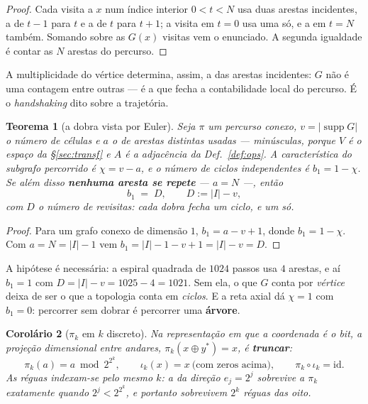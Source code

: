 \documentclass[11pt,a4paper]{article}
\newcommand{\abs}[1]{\lvert #1\rvert}
\newtheorem{teorema}{Teorema}
\newtheorem{corolario}[teorema]{Corolário}
\begin{document}
\begin{proof}
Cada visita a $x$ num índice interior $0<t<N$ usa duas arestas incidentes, a de
$t-1$ para $t$ e a de $t$ para $t+1$; a visita em $t=0$ usa uma só, e a em $t=N$
também. Somando sobre as $G(x)$ visitas vem o enunciado. A segunda igualdade é
contar as $N$ arestas do percurso.
\end{proof}

\medskip\noindent A multiplicidade do vértice determina, assim, a das arestas
incidentes: $G$ não é uma contagem entre outras --- é a que fecha a
contabilidade local do percurso. É o \emph{handshaking} dito sobre a
trajetória.

\begin{teorema}[a dobra vista por Euler]\label{thm:euler}
Seja $\pi$ um percurso conexo, $v=\lvert\operatorname{supp}G\rvert$ o número de
células e $a$ o de arestas \emph{distintas} usadas --- minúsculas, porque $V$ é
o espaço da §\ref{sec:transf} e $A$ é a adjacência da Def.~\ref{def:ops}. A
característica do subgrafo percorrido é $\chi=v-a$, e o número de ciclos
independentes é $b_1=1-\chi$. Se além disso \textbf{nenhuma aresta se repete}
--- $a=N$ ---,
então
\[
b_1\;=\;D,\qquad D:=\abs{I}-v ,
\]
com $D$ o número de revisitas: cada dobra fecha um ciclo, e um só.
\end{teorema}

\begin{proof}
Para um grafo conexo de dimensão $1$, $b_1=a-v+1$, donde $b_1=1-\chi$. Com
$a=N=\abs{I}-1$ vem $b_1=\abs{I}-1-v+1=\abs{I}-v=D$.
\end{proof}

\medskip\noindent A hipótese é necessária: a espiral quadrada de $1024$ passos
usa $4$ arestas, e aí $b_1=1$ com $D=\abs{I}-v=1025-4=1021$. Sem ela, o que $G$ conta por
\emph{vértice} deixa de ser o que a topologia conta em \emph{ciclos}. E a reta
axial dá $\chi=1$ com $b_1=0$: percorrer sem dobrar é percorrer uma
\textbf{árvore}.

\begin{corolario}[$\pi_k$ em $k$ discreto]\label{cor:pik}
Na representação em que a coordenada \emph{é} o bit, a projeção dimensional
entre andares, $\pi_k(x\oplus y^{*})=x$, é \textbf{truncar}:
\[
\pi_k(a)=a\bmod 2^{2^{k}},\qquad
\iota_k(x)=x\ \text{(com zeros acima)},\qquad
\pi_k\circ\iota_k=\mathrm{id}.
\]
As réguas indexam-se pelo mesmo $k$: a da direção $e_j=2^{j}$ sobrevive a
$\pi_k$ exatamente quando $2^{j}<2^{2^{k}}$, e portanto sobrevivem $2^{k}$
réguas das oito.
\end{corolario}
\end{document}
